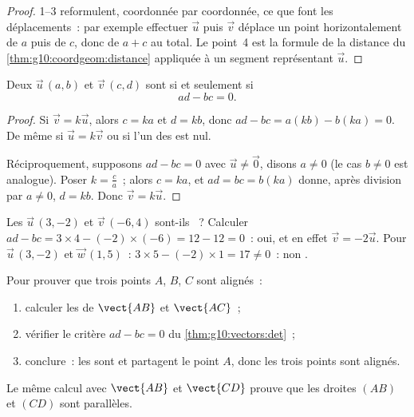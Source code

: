 \begin{proof}
1--3 reformulent, coordonnée par coordonnée, ce que font les
déplacements~: par exemple effectuer $\vec u$ puis $\vec v$ déplace un
point horizontalement de $a$ puis de $c$, donc de $a + c$ au total. Le
point~4 est la formule de la distance du \cref{thm:g10:coordgeom:distance}
appliquée à un segment représentant $\vec u$.
\end{proof}

\begin{theorem}\label{thm:g10:vectors:det}
Deux  $\vec u\,(a, b)$ et $\vec v\,(c, d)$ sont  si et
seulement si
\[
ad - bc = 0 .
\]
\end{theorem}

\begin{proof}
Si $\vec v = k\vec u$, alors $c = ka$ et $d = kb$, donc
$ad - bc = a(kb) - b(ka) = 0$. De même si $\vec u = k \vec v$ ou si l'un
des  est nul.

Réciproquement, supposons $ad - bc = 0$ avec $\vec u \neq \vec 0$,
disons $a \neq 0$ (le cas $b \neq 0$ est analogue). Poser
$k = \frac{c}{a}$~; alors $c = ka$, et $ad = bc = b(ka)$ donne, après
division par $a \neq 0$, $d = kb$. Donc $\vec v = k\vec u$.
\end{proof}

\begin{example}\label{ex:g10:vectors:det}
Les  $\vec u\,(3, -2)$ et $\vec v\,(-6, 4)$ sont-ils
~? Calculer
$ad - bc = 3 \times 4 - (-2)\times(-6) = 12 - 12 = 0$~: oui, et en effet
$\vec v = -2\vec u$. Pour $\vec u\,(3, -2)$ et $\vec w\,(1, 5)$~:
$3 \times 5 - (-2) \times 1 = 17 \neq 0$~: non .
\end{example}

\begin{method}\label{met:g10:vectors:alignment}
Pour prouver que trois points $A$, $B$, $C$ sont alignés~:
\begin{enumerate}
  \item calculer les  de $\vect{AB}$ et $\vect{AC}$~;
  \item vérifier le critère $ad - bc = 0$ du \cref{thm:g10:vectors:det}~;
  \item conclure~: les  sont  et partagent le point
        $A$, donc les trois points sont alignés.
\end{enumerate}
Le même calcul avec $\vect{AB}$ et $\vect{CD}$ prouve que les droites
$(AB)$ et $(CD)$ sont parallèles.
\end{method}

